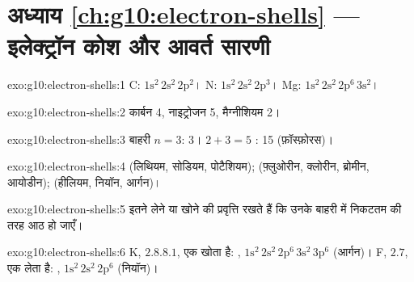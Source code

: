 \section*{अध्याय \ref{ch:g10:electron-shells} --- इलेक्ट्रॉन कोश और आवर्त सारणी}

\begin{solution}{exo:g10:electron-shells:1}
C: $1\mathrm{s}^2\,2\mathrm{s}^2\,2\mathrm{p}^2$। N:
$1\mathrm{s}^2\,2\mathrm{s}^2\,2\mathrm{p}^3$। Mg:
$1\mathrm{s}^2\,2\mathrm{s}^2\,2\mathrm{p}^6\,3\mathrm{s}^2$।
\end{solution}

\begin{solution}{exo:g10:electron-shells:2}
कार्बन 4, नाइट्रोजन 5, मैग्नीशियम 2।
\end{solution}

\begin{solution}{exo:g10:electron-shells:3}
बाहरी  $n = 3$:  3। $2 + 3 = 5$ :  15
(फ़ॉस्फ़ोरस)।
\end{solution}

\begin{solution}{exo:g10:electron-shells:4}
 (लिथियम, सोडियम, पोटैशियम);  (फ़्लुओरीन,
क्लोरीन, ब्रोमीन, आयोडीन);  (हीलियम, नियॉन, आर्गन)।
\end{solution}

\begin{solution}{exo:g10:electron-shells:5}
 इतने  लेने या खोने की प्रवृत्ति रखते हैं कि उनके बाहरी  में
निकटतम  की तरह आठ  हो जाएँ।
\end{solution}

\begin{solution}{exo:g10:electron-shells:6}
K, $2.8.8.1$, एक खोता है: ,
$1\mathrm{s}^2\,2\mathrm{s}^2\,2\mathrm{p}^6\,3\mathrm{s}^2\,3\mathrm{p}^6$
(आर्गन)। F, $2.7$, एक लेता है: ,
$1\mathrm{s}^2\,2\mathrm{s}^2\,2\mathrm{p}^6$ (नियॉन)।
\end{solution}

